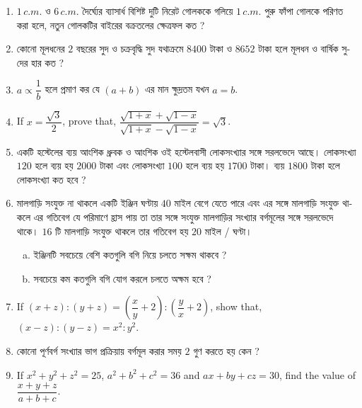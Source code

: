 \documentclass[11pt, a4paper]{article}
\begin{document}
\begin{enumerate}
	\item $1 \, c.m.$ \textbengali{ও} $6  \, c.m.$ \textbengali{দৈর্ঘ্যের ব্যাসার্ধ বিশিষ্ট দুটি নিরেট গোলককে গলিয়ে}  $1 \, c.m.$ \textbengali{পুরু ফাঁপা গোলকে পরিণত করা হলে, নতুন গোলকটির বাইরের বক্রতলের ক্ষেত্রফল কত ?}
	
	\item \textbengali{কোনো মূলধনের} $2$ \textbengali{বছরের সুদ ও চক্রবৃদ্ধি সুদ যথাক্রমে} $8400$ \textbengali{টাকা ও} $8652$ \textbengali{টাকা হলে মূলধন ও বার্ষিক সুদের হার কত ?}
	
	\item $a \propto \dfrac{1}{b}$ \textbengali{হলে প্রমাণ কর যে} $(a+b)$ \textbengali{এর মান ক্ষুদ্রতম যখন} $a = b$.
	
	\item If $x = \dfrac{\sqrt{3}}{2}$, prove that, $\dfrac{\sqrt{1+x} + \sqrt{1-x}}{\sqrt{1+x} - \sqrt{1-x}} = \sqrt{3}$.
	
	\item \textbengali{একটি হস্টেলের ব্যয় আংশিক ধ্রুবক ও আংশিক ওই হস্টেলবাসী লোকসংখ্যার সঙ্গে সরলভেদে আছে। লোকসংখ্যা} $120$ \textbengali{হলে ব্যয় হয়} $2000$ \textbengali{টাকা এবং লোকসংখ্যা} $100$ \textbengali{হলে ব্যয় হয়} $1700$ \textbengali{টাকা। ব্যয়} $1800$ \textbengali{টাকা হলে লোকসংখ্যা কত হবে ?}
	
	\item \textbengali{মালগাড়ি সংযুক্ত না থাকলে একটি ইঞ্জিন ঘণ্টায়} $40$ \textbengali{মাইল বেগে যেতে পারে এবং এর সঙ্গে মালগাড়ি সংযুক্ত থাকলে এর গতিবেগ যে পরিমাণে হ্রাস পায় তা তার সঙ্গে সংযুক্ত মালগাড়ির সংখ্যার বর্গমূলের সঙ্গে সরলভেদে থাকে।} $16$ \textbengali{টি মালগাড়ি সংযুক্ত থাকলে তার গতিবেগ হয়} $20$ \textbengali{মাইল / ঘণ্টা।}
	\begin{enumerate}[(a)]
		\item \textbengali{ইঞ্জিনটি সবচেয়ে বেশি কতগুলি বগি নিয়ে চলতে সক্ষম থাকবে ?}
		\item \textbengali{সবচেয়ে কম কতগুলি বগি যোগ করলে চলতে অক্ষম হবে ?}
	
	\end{enumerate}
	
	\item If $(x+z) :(y+z) = \left(\dfrac{x}{y} +2 \right) : \left( \dfrac{y}{x} + 2 \right)$, show that, $(x-z) : (y - z) = x^2 : y^2$.
	
	\item \textbengali{কোনো পূর্ণবর্গ সংখ্যার ভাগ প্রক্রিয়ায় বর্গমূল করার সময়} $2$ \textbengali{গুণ করতে হয় কেন ?}
	
	\item If $x^2 + y^2 + z^2 = 25$, $a^2 + b^2 + c^2 = 36$ and $ax + by + cz = 30$, find the value of $\dfrac{x+y+z}{a+b+c}$.
	

\end{enumerate}
\end{document}
